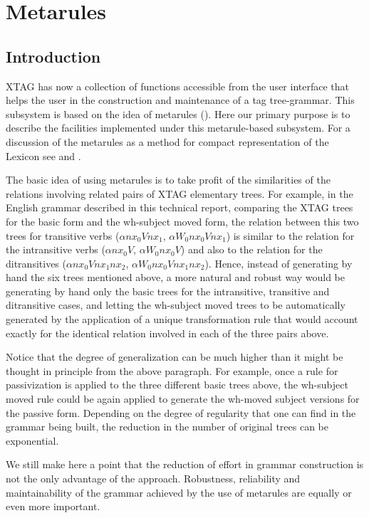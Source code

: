 \chapter{Metarules}
\label{metarules}

\section{Introduction}
\label{introduction}

XTAG has now a collection of functions accessible from the user interface that
helps the user in the construction and maintenance of a tag tree-grammar.
This subsystem is based on the idea of metarules (\cite{becker93}).
Here our primary
purpose is to describe the facilities implemented under this 
metarule-based subsystem.
For a discussion of the metarules as a method for compact representation 
of the Lexicon see \cite{becker93} and \cite{srini94}.

The basic idea of using metarules is to take profit of the similarities of the
relations involving related pairs of XTAG elementary trees. 
For example, in the English grammar described in this technical report,
comparing the XTAG trees for the basic form and the 
wh-subject moved form, the relation between this two trees for transitive verbs
($\alpha nx_0Vnx_1$, $\alpha W_0nx_0Vnx_1$) is similar to the relation for the
intransitive verbs ($\alpha nx_0V$, $\alpha W_0nx_0V$) and also to the 
relation for the ditransitives ($\alpha nx_0Vnx_1nx_2$, 
$\alpha W_0nx_0Vnx_1nx_2$). Hence, instead of generating by hand the six trees 
mentioned above, a more natural and robust way would be generating by hand 
only the basic trees for the intransitive, transitive and ditransitive cases, 
and letting the wh-subject moved trees to be automatically generated by the
application of a unique transformation rule that would account exactly for
the identical relation involved in each of the three pairs above.

Notice that the degree of generalization can be much higher than it might be
thought in principle from the above paragraph. For example, once a rule for
passivization is applied to the three different basic trees above, the 
wh-subject moved rule could be again applied to generate the wh-moved subject
versions for the passive form. Depending on the degree of regularity that one
can find in the grammar being built, the reduction in the number of original
trees can be exponential. 

We still make here a point that the reduction of effort in grammar construction
is not the only advantage of the approach. Robustness, 
reliability and maintainability of the grammar achieved by the use of  
metarules are equally or even more important.

